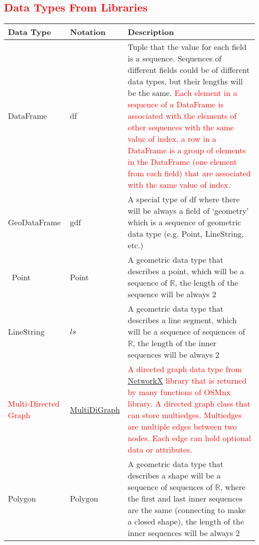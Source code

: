 \documentclass[12pt, titlepage]{article}
\begin{document}
\subsection{\textcolor{red}{Data Types From Libraries}}
\begin{center}
\renewcommand{\arraystretch}{1.2}
\noindent 
\begin{tabular}{l l p{7.5cm}} 
\toprule 
\textbf{Data Type} & \textbf{Notation} & \textbf{Description}\\ 
\midrule
DataFrame & df & Tuple that the value for each field is a sequence. Sequences of different fields could be of different data types, but their lengths will be the same. \textcolor{red}{Each element in a sequence of a DataFrame is associated with the elements of other sequences with the same value of index, a row in a DataFrame is a group of elements in the DataFrame (one element from each field) that are associated with the same value of index.}\\
GeoDataFrame & gdf & A special type of df where there will be always a field of ‘geometry’ which is a sequence of geometric data type (e.g. Point, LineString, etc.)\\\
Point & Point & A geometric data type that describes a point, which will be a sequence of $\mathbb{R}$, the length of the sequence will be always 2 \\ 
LineString & $ls$ & A geometric data type that describes a line segment, which will be a sequence of sequences of $\mathbb{R}$, the length of the inner sequences will be always 2\\
\textcolor{red}{Multi-Directed Graph} & \href{https://networkx.org/documentation/stable/reference/classes/multidigraph.html}{MultiDiGraph} & \textcolor{red}{A directed graph data type from \href{https://networkx.org/}{NetworkX} library that is returned by many functions of OSMnx library. A directed graph class that can store multiedges. Multiedges are multiple edges between two nodes. Each edge can hold optional data or attributes.} \\
Polygon & Polygon & A geometric data type that describes a shape will be a sequence of sequences of $\mathbb{R}$, where the first and last inner sequences are the same (connecting to make a closed shape), the length of the inner sequences will be always 2 \\
\bottomrule
\end{tabular} 
\end{center}

\newpage
\end{document}
